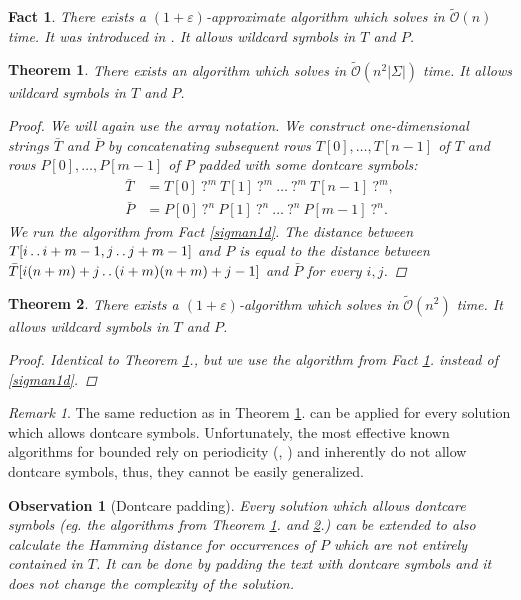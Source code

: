 \documentclass[11pt]{article}
\def\dd{\mathinner{.\,.}}
\newcommand{\tO}{\tilde{\mathcal{O}}}
\newcommand{\eq}[1]{\begin{align*} #1 \end{align*}}
\theoremstyle{plain}
\newtheorem{theorem}{Theorem}
\newtheorem{fact}{Fact}
\newtheorem{observation}{Observation}
\theoremstyle{definition}
\theoremstyle{remark}
\newtheorem*{remark}{Remark}
\begin{document}
\begin{fact}\label{approx1d}
	There exists a $(1 + \varepsilon)$-approximate algorithm which solves \hd in $\tO(n)$ time.
	It was introduced in \cite{Karloff1993}.
	It allows wildcard symbols in $T$ and $P$.
\end{fact}


\begin{theorem}\label{sigman2d}
	There exists an algorithm which solves \HD in $\tO(n^2|\Sigma|)$ time.
	It allows wildcard symbols in $T$ and $P$.
	\begin{proof}
		We will again use the array notation.
		We construct one-dimensional strings $\bar{T}$ and $\bar{P}$ by concatenating subsequent rows $T[0], \dots, T[n - 1]$ of $T$ and rows $P[0], \dots, P[m - 1]$ of $P$ padded with some dontcare symbols:
		\eq{
			\bar{T} &= T[0] \ \texttt{?}^{m} \ T[1] \ \texttt{?}^{m} \ \dots \ \texttt{?}^{m} \ T[n - 1] \ \texttt{?}^{m}, \\
			\bar{P} &= P[0] \ \texttt{?}^{n} \ P[1] \ \texttt{?}^{n} \ \dots \ \texttt{?}^{n} \ P[m - 1] \ \texttt{?}^{n}.
			}                                                                          
		We run the algorithm from Fact \ref{sigman1d}.
		The distance between $T[i \dd i + m - 1, j \dd j + m - 1]$ and $P$ is equal to the distance between $\bar{T}[i(n + m) + j \dd (i + m)(n + m) + j - 1]$ and $\bar{P}$ for every $i, j$.
	\end{proof}
\end{theorem}


\begin{theorem}\label{approx2d}
	There exists a $(1 + \varepsilon)$-algorithm which solves \HD in $\tO(n^2)$ time.
	It allows wildcard symbols in $T$ and $P$.
	\begin{proof}
		Identical to Theorem \ref{sigman2d}., but we use the algorithm from Fact \ref{approx1d}. instead of \ref{sigman1d}.
	\end{proof}
\end{theorem}


\begin{remark}
	The same reduction as in Theorem \ref{sigman2d}. can be applied for every \hd solution which allows dontcare symbols.
	Unfortunately, the most effective known algorithms for bounded \hd rely on periodicity (\cite{Clifford2015}, \cite{Gawrychowski2017}) and inherently do not allow dontcare symbols, thus, they cannot be easily generalized.
\end{remark}


\begin{observation}[Dontcare padding]
	Every \HD solution which allows dontcare symbols (eg. the algorithms from Theorem \ref{sigman2d}. and \ref{approx2d}.) can be extended to also calculate the Hamming distance for occurrences of $P$ which are not entirely contained in $T$.
	It can be done by padding the text with dontcare symbols and it does not change the complexity of the solution.
\end{observation}
\end{document}
